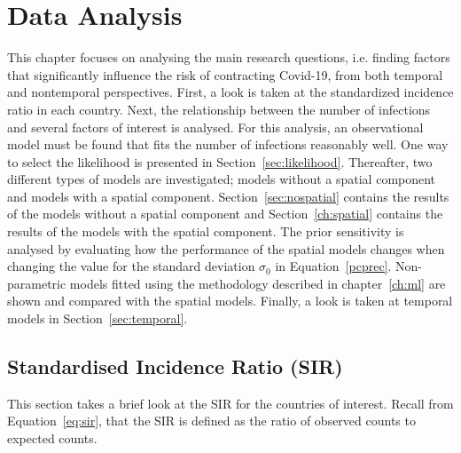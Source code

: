 %
\chapter{Data Analysis}
\label{sec:analysis}
This chapter focuses on analysing the main research questions, i.e. finding factors that significantly influence the risk of contracting Covid-19, from both temporal and nontemporal perspectives. First, a look is taken at the standardized incidence ratio in each country. Next, the relationship between the number of infections and several factors of interest is analysed. For this analysis, an observational model must be found that fits the number of infections reasonably well. One way to select the likelihood is presented in Section~\ref{sec:likelihood}. Thereafter, two different types of models are investigated; models without a spatial component and models with a spatial component. Section~\ref{sec:nospatial} contains the results of the models without a spatial component and Section~\ref{ch:spatial} contains the results of the models with the spatial component. The prior sensitivity is analysed by evaluating how the performance of the spatial models changes when changing the value for the standard deviation $\sigma_0$ in Equation~\ref{pcprec}. Non-parametric models fitted using the methodology described in chapter~\ref{ch:ml} are shown and compared with the spatial models. Finally, a look is taken at temporal models in Section~\ref{sec:temporal}.
\clearpage
\section{Standardised Incidence Ratio (SIR)}
This section takes a brief look at the SIR for the countries of interest. Recall from Equation~\ref{eq:sir}, that the SIR is defined as the ratio of observed counts to expected counts.
